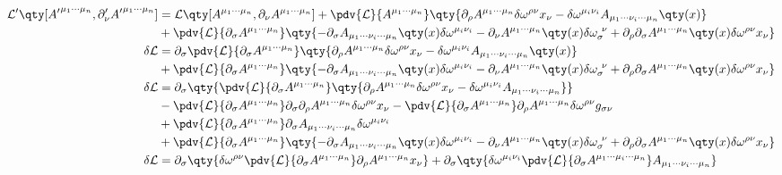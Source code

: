 \documentclass[twoside]{amsart}
\numberwithin{equation}{section}
\begin{document}
\begin{refsection}
\begin{align}
    \mathcal L'\qty[{A'}^{\mu_1\cdots\mu_n},\partial_\nu' {A'}^{\mu_1\cdots\mu_n}]&=\mathcal L\qty[A^{\mu_1\cdots\mu_n},\partial_\nu A^{\mu_1\cdots\mu_n}]+\pdv{\mathcal L}{A^{\mu_1\cdots\mu_n}}\qty{\partial_\rho A^{\mu_1\cdots\mu_n}\delta\omega^{\rho\nu}x_\nu-\delta\omega^{\mu_i\nu_i}A_{\mu_1\cdots\nu_i\cdots\mu_n}\qty(x)}\\
    &+\pdv{\mathcal L}{\partial_\sigma A^{\mu_1\cdots\mu_n}}\qty{-\partial_\sigma A_{\mu_1\cdots\nu_i\cdots\mu_n}\qty(x)\delta\omega^{\mu_i\nu_i}-\partial_{\nu} A^{\mu_1\cdots\mu_n}\qty(x)\delta\omega_{\sigma}^{\ \nu}+\partial_\rho\partial_\sigma A^{\mu_1\cdots\mu_n}\qty(x)\delta\omega^{\rho\nu}x_\nu}\\
    \delta\mathcal L&=\partial_\sigma\pdv{\mathcal L}{\partial_\sigma A^{\mu_1\cdots\mu_n}}\qty{\partial_\rho A^{\mu_1\cdots\mu_n}\delta\omega^{\rho\nu}x_\nu-\delta\omega^{\mu_i\nu_i}A_{\mu_1\cdots\nu_i\cdots\mu_n}\qty(x)}\\
    &+\pdv{\mathcal L}{\partial_\sigma A^{\mu_1\cdots\mu_n}}\qty{-\partial_\sigma A_{\mu_1\cdots\nu_i\cdots\mu_n}\qty(x)\delta\omega^{\mu_i\nu_i}-\partial_\nu A^{\mu_1\cdots\mu_n}\qty(x)\delta\omega_{\sigma}^{\ \nu}+\partial_\rho\partial_\sigma A^{\mu_1\cdots\mu_n}\qty(x)\delta\omega^{\rho\nu}x_\nu}\\
    \delta\mathcal L&=\partial_\sigma\qty{\pdv{\mathcal L}{\partial_\sigma A^{\mu_1\cdots\mu_n}}\qty{\partial_\rho A^{\mu_1\cdots\mu_n}\delta\omega^{\rho\nu}x_\nu-\delta\omega^{\mu_i\nu_i}A_{\mu_1\cdots\nu_i\cdots\mu_n}}}\\
    &-\pdv{\mathcal L}{\partial_\sigma A^{\mu_1\cdots\mu_n}}\partial_\sigma\partial_\rho A^{\mu_1\cdots\mu_n}\delta\omega^{\rho\nu}x_\nu-\pdv{\mathcal L}{\partial_\sigma A^{\mu_1\cdots\mu_n}}\partial_\rho A^{\mu_1\cdots\mu_n}\delta\omega^{\rho\nu}g_{\sigma\nu}\\
    &+\pdv{\mathcal L}{\partial_\sigma A^{\mu_1\cdots\mu_n}}\partial_\sigma A_{\mu_1\cdots\nu_i\cdots\mu_n}\delta\omega^{\mu_i\nu_i}\\
    &+\pdv{\mathcal L}{\partial_\sigma A^{\mu_1\cdots\mu_n}}\qty{-\partial_\sigma A_{\mu_1\cdots\nu_i\cdots\mu_n}\qty(x)\delta\omega^{\mu_i\nu_i}-\partial_\nu A^{\mu_1\cdots\mu_n}\qty(x)\delta\omega_{\sigma}^{\ \nu}+\partial_\rho\partial_\sigma A^{\mu_1\cdots\mu_n}\qty(x)\delta\omega^{\rho\nu}x_\nu}\\
    \delta\mathcal L&=\partial_\sigma\qty{\delta\omega^{\rho\nu}\pdv{\mathcal L}{\partial_\sigma A^{\mu_1\cdots\mu_n}}\partial_\rho A^{\mu_1\cdots\mu_n}x_\nu}+\partial_\sigma\qty{\delta\omega^{\mu_i\nu_i}\pdv{\mathcal L}{\partial_\sigma A^{\mu_1\cdots\mu_i\cdots\mu_n}}A_{\mu_1\cdots\nu_i\cdots\mu_n}}\\

\end{align}
\end{refsection}
\end{document}
